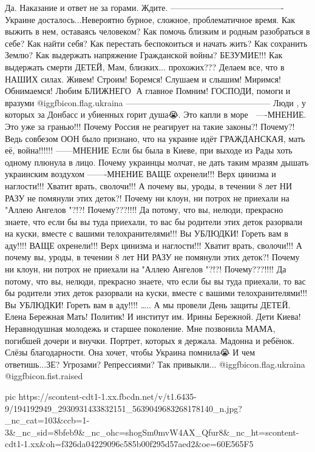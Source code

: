 Да. Наказание и ответ не за горами.  Ждите.
—————————————-
Украине досталось...Невероятно бурное, сложное, проблематичное время. 
Как выжить в нем, 
оставаясь человеком? 
Как помочь близким и родным разобраться в себе? 
Как найти  себя? 
Как перестать беспокоиться и начать жить? 
Как сохранить Землю?
Как выдержать напряжение Гражданской войны? БЕЗУМИЕ!!! 
Как выдержать  смерти ДЕТЕЙ, Мам, близких... прохожих???
Делаем все, что в НАШИХ силах.  Живем! Строим! Боремся!  Слушаем и слышим! Миримся! Обнимаемся! Любим БЛИЖНЕГО🙏
А главное Помним! 
ГОСПОДИ, 
помоги и вразуми @igg{fbicon.flag.ukraina}
—————————————————
Люди , у которых  за Донбасс и убиенных горит душа😭. 
Это капли в море 🌊 
—-МНЕНИЕ.
Это  уже за гранью!!! Почему Россия не реагирует на такие законы?! Почему?! Ведь совбезом ООН было признано, что на украине идёт ГРАЖДАНСКАЯ, мать её, война!!!!!!
——МНЕНИЕ
Если бы была в Киеве, при выходе из Рады хоть одному плюнула в лицо. Почему украинцы молчат, не дать таким мразям дышать украинским воздухом
 ——-МНЕНИЕ
ВАЩЕ охренели!!! Верх цинизма и наглости!!! Хватит врать, сволочи!!!
А почему вы, уроды, в течении 8 лет НИ РАЗУ не помянули этих деток?! Почему ни клоун, ни потрох не приехали на "Аллею Ангелов "?!?! Почему???!!!! Да потому, что вы, нелюди, прекрасно знаете, что если бы вы туда приехали, то вас бы родители этих деток разорвали на куски, вместе с вашими телохранителями!!! Вы УБЛЮДКИ! Гореть вам в аду!!!! ВАЩЕ охренели!!! Верх цинизма и наглости!!! Хватит врать, сволочи!!!
А почему вы, уроды, в течении 8 лет НИ РАЗУ не помянули этих деток?! Почему ни клоун, ни потрох не приехали на "Аллею Ангелов "?!?! Почему???!!!! Да потому, что вы, нелюди, прекрасно знаете, что если бы вы туда приехали, то вас бы родители этих деток разорвали на куски, вместе с вашими телохранителями!!! Вы УБЛЮДКИ! Гореть вам в аду!!!!
…..
 А мы провели День защиты ДЕТЕЙ.  
Елена Бережная Мать! Политик! 
И институт им. Ирины Бережной. Дети Киева! Неравнодушная молодежь и старшее поколение. 
Мне позвонила МАМА, погибшей дочери и внучки. Портрет, которых я держала.  Мадонна и ребёнок. Слёзы благодарности. 
Она хочет, чтобы Украина помнила😭
И чем ответишь...ЗЕ?
Угрозами? 
Репрессиями? 
Так привыкли... @igg{fbicon.flag.ukraina}  @igg{fbicon.fist.raised} 

\ifcmt
  pic https://scontent-cdt1-1.xx.fbcdn.net/v/t1.6435-9/194192949_2930931433832151_5639049683268178140_n.jpg?_nc_cat=103&ccb=1-3&_nc_sid=8bfeb9&_nc_ohc=shogSm0mvW4AX_Qfur8&_nc_ht=scontent-cdt1-1.xx&oh=f326da04229096c585b00f295d57aed2&oe=60E565F5
\fi

